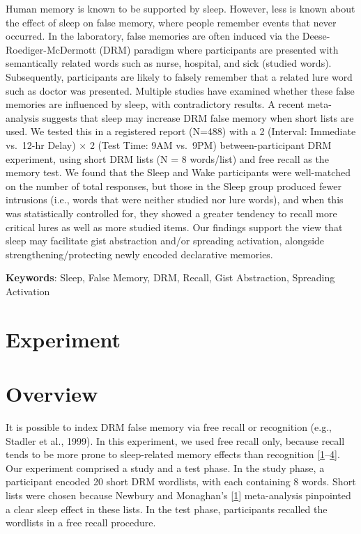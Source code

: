 \documentclass[
]{article}
\begin{document}
Human memory is known to be supported by sleep. However, less is known about the effect of sleep on false memory, where people remember events that never occurred. In the laboratory, false memories are often induced via the Deese-Roediger-McDermott (DRM) paradigm where participants are presented with semantically related words such as nurse, hospital, and sick (studied words). Subsequently, participants are likely to falsely remember that a related lure word such as doctor was presented. Multiple studies have examined whether these false memories are influenced by sleep, with contradictory results. A recent meta-analysis suggests that sleep may increase DRM false memory when short lists are used. We tested this in a registered report (N=488) with a 2 (Interval: Immediate vs.~12-hr Delay) \(\times\) 2 (Test Time: 9AM vs.~9PM) between-participant DRM experiment, using short DRM lists (N = 8 words/list) and free recall as the memory test. We found that the Sleep and Wake participants were well-matched on the number of total responses, but those in the Sleep group produced fewer intrusions (i.e., words that were neither studied nor lure words), and when this was statistically controlled for, they showed a greater tendency to recall more critical lures as well as more studied items. Our findings support the view that sleep may facilitate gist abstraction and/or spreading activation, alongside strengthening/protecting newly encoded declarative memories.

\textbf{Keywords}: Sleep, False Memory, DRM, Recall, Gist Abstraction, Spreading Activation

\hypertarget{experiment}{%
\section*{Experiment}\label{experiment}}

\hypertarget{overview}{%
\section{Overview}\label{overview}}

It is possible to index DRM false memory via free recall or recognition (e.g., Stadler et al., 1999). In this experiment, we used free recall only, because recall tends to be more prone to sleep-related memory effects than recognition {[}\protect\hyperlink{ref-newbury2019a}{1}--\protect\hyperlink{ref-lipinska2019a}{4}{]}. Our experiment comprised a study and a test phase. In the study phase, a participant encoded 20 short DRM wordlists, with each containing 8 words. Short lists were chosen because Newbury and Monaghan's {[}\protect\hyperlink{ref-newbury2019a}{1}{]} meta-analysis pinpointed a clear sleep effect in these lists. In the test phase, participants recalled the wordlists in a free recall procedure.
\end{document}
